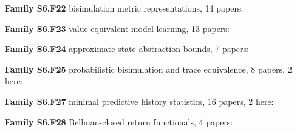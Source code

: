 \documentclass[10pt]{article}
\newcommand{\memb}[1]{\par\smallskip\textbf{#1}\quad}
\begin{document}
\memb{Family S6.F22} bisimulation metric representations, 14 papers: {\footnotesize \citetext{\citealp{Ferns-metrics04}; \citealp{Zhang-learning21}; \citealp{Ferns-methods06}; \citealp{Castro-using10}; \citealp{Ferns-bisimulation11}; \citealp{Castro-scalable19}; \citealp{Zhang-invariant20}; \citealp{Zhang-learning20}; \citealp{Agarwal-contrastive21}; \citealp{Castro-mico21}; \citealp{Kemertas-robust21}; \citealp{Lan-metrics21}; \citealp{Zang-simsr21}; \citealp{Hansen-Estruch-bisimulation22}}}

\memb{Family S6.F23} value-equivalent model learning, 13 papers: {\footnotesize \citetext{\citealp{Arumugam-rate22}; \citealp{Schrittwieser-mastering19}; \citealp{Abachi-policyaware20}; \citealp{Ayoub-modelbased20}; \citealp{Grimm-value20}; \citealp{Lambert-objective20}; \citealp{Eysenbach-mismatched21}; \citealp{Grimm-proper21}; \citealp{Nikishin-controloriented21}; \citealp{Voelcker-value22}; \citealp{He-model23}; \citealp{Wei-unified23}; \citealp{Hutson-policyshaped24}}}

\memb{Family S6.F24} approximate state abstraction bounds, 7 papers: {\footnotesize \citetext{\citealp{Li-towards06}; \citealp{Abel-near17}; \citealp{Asadi-lipschitz18}; \citealp{Nachum-nearoptimal18}; \citealp{Zhang-decoupling18}; \citealp{Rodriguez-Sanchez-learning24}; \citealp{Zhang-compositional26}}}

\memb{Family S6.F25} probabilistic bisimulation and trace equivalence, 8 papers, 2 here: {\footnotesize \citetext{\citealp{Givan-equivalence03}; \citealp{Larsen-bisimulation91}}}

\memb{Family S6.F27} minimal predictive history statistics, 16 papers, 2 here: {\footnotesize \citetext{\citealp{Hutter-extreme14}; \citealp{Majeed-performance18}}}

\memb{Family S6.F28} Bellman-closed return functionals, 4 papers: {\footnotesize \citetext{\citealp{AvilaPires-optimizing25}; \citealp{Marthe-beyond23}; \citealp{Rowland-statistics19}; \citealp{Achab-robustness21}}}
\end{document}
